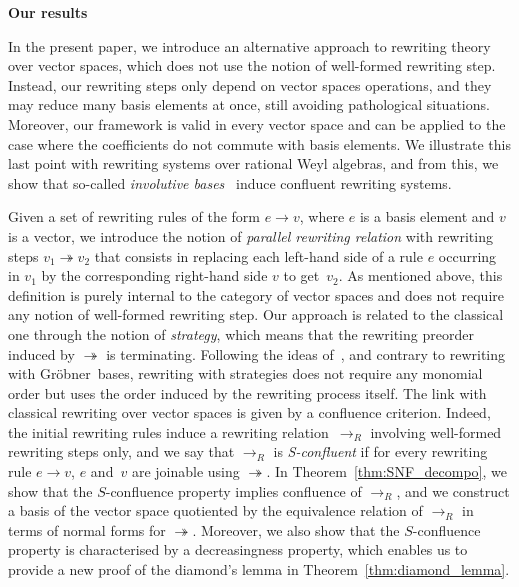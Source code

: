 \documentclass[11pt]{article}
\theoremstyle{definition}
\newcommand\G{Gröbner}
\newcommand\rewR{\to_R}
\newcommand\parRew{\twoheadrightarrow}
\begin{document}
\begin{center}
  {\large\bf Our results}
\end{center}

In the present paper, we introduce an alternative approach to rewriting theory
over vector spaces, which does not use the notion of well-formed rewriting
step. Instead, our rewriting steps only depend on vector spaces operations, and they
may reduce many basis elements at once, still avoiding pathological
situations. Moreover, our framework is valid in every vector space and can be
applied to the case where the coefficients do not commute with basis
elements. We illustrate this last point with rewriting systems over rational
Weyl algebras, and from this, we show that so-called {\em involutive
  bases}~\cite{MR1627129} induce confluent rewriting systems.  \medskip

Given a set of rewriting rules of the form $e\to v$, where $e$ is a basis element
and $v$ is a vector, we introduce the notion of {\em parallel rewriting
  relation} with rewriting steps $v_1\parRew v_2$ that consists in replacing
each left-hand side of a rule $e$ occurring in $v_1$ by the corresponding
right-hand side $v$ to get~$v_2$. As mentioned above, this definition is purely
internal to the category of vector spaces and does not require any notion of
well-formed rewriting step. Our approach is related to the classical one through
the notion of {\em strategy}, which means that the rewriting preorder induced by
$\parRew$ is terminating. Following the ideas of~\cite{GuiraudHoffbeckMalbos19},
and contrary to rewriting with \G\ bases, rewriting with strategies does not
require any monomial order but uses the order induced by the rewriting process
itself. The link with classical rewriting over vector spaces is given by a
confluence criterion. Indeed, the initial rewriting rules induce a rewriting
relation~$\rewR$ involving well-formed rewriting steps only, and we say that
$\rewR$ is {\em S-confluent} if for every rewriting rule $e\to v$, $e$ and~$v$ are
joinable using $\parRew$. In Theorem~\ref{thm:SNF_decompo}, we show
that the $S$-confluence property implies confluence of $\rewR$, and we construct
a basis of the vector space quotiented by the equivalence relation of $\rewR$ in
terms of normal forms for $\parRew$. Moreover, we also show that the
$S$-confluence property is characterised by a decreasingness property, which
enables us to provide a new proof of the diamond's lemma in
Theorem~\ref{thm:diamond_lemma}.  \medskip
\end{document}

